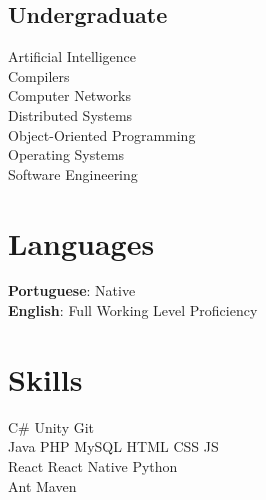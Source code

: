 \documentclass[a4paper]{deedy-resume} %
\begin{document}
\begin{minipage}[t]{0.33\textwidth}
\subsection{Undergraduate}

Artificial Intelligence\\
Compilers\\
Computer Networks\\
Distributed Systems\\
Object-Oriented Programming\\
Operating Systems\\
Software Engineering\\
\sectionspace %



\section{Languages} 
\textbf{Portuguese}: Native\\
\textbf{English}: Full Working Level Proficiency\\

\sectionspace %


\section{Skills}


C\# \textbullet{} Unity \textbullet{} Git\\

Java \textbullet{} PHP \textbullet{} MySQL \textbullet{} HTML \textbullet{} CSS \textbullet{} JS\\

React \textbullet{} React Native \textbullet{} Python\\
Ant \textbullet{} Maven\\


\sectionspace %

\end{minipage} %
\end{document}
